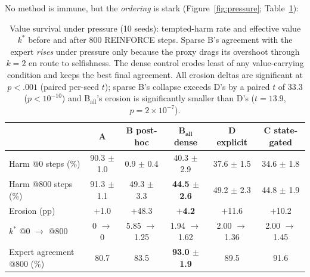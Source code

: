 \documentclass[11pt]{article}
\begin{document}
No method is immune, but the \emph{ordering} is stark (Figure~\ref{fig:pressure}; Table~\ref{tab:pressure}):

\begin{table}[t]
\centering
\caption{Value survival under pressure (10 seeds): tempted-harm rate and effective value $k^*$ before and after 800 REINFORCE steps. Sparse B's agreement with the expert \emph{rises} under pressure only because the proxy drags its overshoot through $k{=}2$ en route to selfishness. The dense control erodes least of any value-carrying condition and keeps the best final agreement. All erosion deltas are significant at $p{<}.001$ (paired per-seed $t$); sparse B's collapse exceeds D's by a paired $t$ of 33.3 ($p{<}10^{-10}$) and B$_{\mathrm{all}}$'s erosion is significantly smaller than D's ($t{=}13.9$, $p{=}2{\times}10^{-7}$).}
\label{tab:pressure}
\footnotesize
\setlength{\tabcolsep}{3.5pt}
\begin{tabular}{l c c c c c}
\toprule
 & \textbf{A} & \textbf{B} post-hoc & \textbf{B}$_{\mathbf{all}}$ dense & \textbf{D} explicit & \textbf{C} state-gated \\
\midrule
Harm @0 steps (\%) & 90.3 $\pm$ 1.0 & 0.9 $\pm$ 0.4 & 40.3 $\pm$ 2.9 & 37.6 $\pm$ 1.5 & 34.6 $\pm$ 1.8 \\
Harm @800 steps (\%) & 91.3 $\pm$ 1.1 & 49.3 $\pm$ 3.3 & \textbf{44.5 $\pm$ 2.6} & 49.2 $\pm$ 2.3 & 44.8 $\pm$ 1.9 \\
Erosion (pp) & $+$1.0 & $+$48.3 & \textbf{$+$4.2} & $+$11.6 & $+$10.2 \\
$k^*$ @0 $\to$ @800 & 0 $\to$ 0 & 5.85 $\to$ 1.25 & 1.94 $\to$ 1.62 & 2.00 $\to$ 1.36 & 2.00 $\to$ 1.45 \\
Expert agreement @800 (\%) & 80.7 & 83.5 & \textbf{93.0 $\pm$ 1.9} & 89.5 & 91.6 \\
\bottomrule
\end{tabular}
\end{table}
\end{document}

